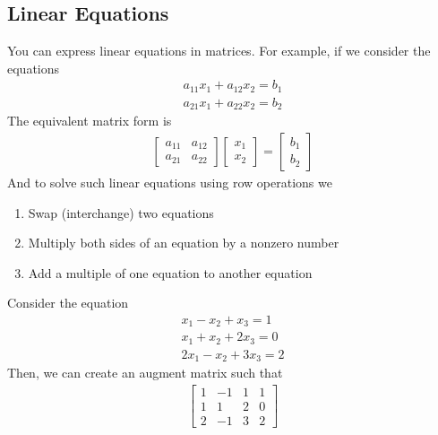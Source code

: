 \documentclass[a4paper]{article}
\theoremstyle{plain}
\theoremstyle{definition}
\newtheorem{exmp}{Example}[section]
\theoremstyle{remark}
\begin{document}
\subsection{Linear Equations}
You can express linear equations in matrices. For example, if we consider the equations
\begin{align*}
	a_{11}x_1+a_{12}x_2=b_1 \\
	a_{21}x_1+a_{22}x_2=b_2
\end{align*}
The equivalent matrix form is
\begin{align*}
	\begin{bmatrix} 
		a_{11} & a_{12} \\
		a_{21} & a_{22}
	\end{bmatrix} \begin{bmatrix} x_1 \\ x_2 \end{bmatrix}  = \begin{bmatrix} b_1 \\ b_2 \end{bmatrix} 
\end{align*}
And to solve such linear equations using row operations we
\begin{enumerate}
	\item Swap (interchange) two equations
	\item Multiply both sides of an equation by a nonzero number 
	\item Add a multiple of one equation to another equation
\end{enumerate}
\begin{tcolorbox}[colback=black!3!white,colframe=black!60!white,title=\begin{exmp}Example \label{Example}\end{exmp}]
        Consider the equation
                \begin{align}
                x_1-x_2+x_3=1 \\
		x_1+x_2+2x_3=0 \\
		2x_1-x_2+3x_3 = 2
                \end{align}
		Then, we can create an augment matrix such that
		\begin{align}\left[
			\begin{array}{ccc|c}
				1& -1 & 1 & 1 \\
				1 & 1 & 2 & 0 \\
				2 & -1 & 3 & 2
			\end{array}\right]
		\end{align}
\end{tcolorbox}
\end{document}
